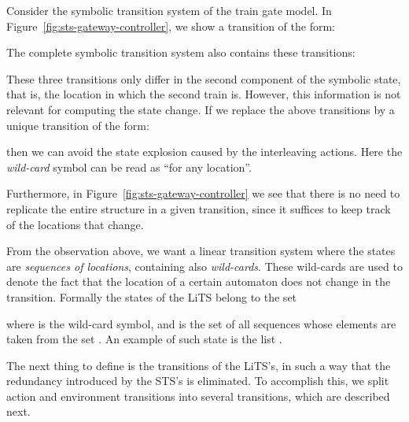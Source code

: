 \documentclass[submission,copyright,creativecommons,sharealike]{eptcs}
\begin{document}
Consider the symbolic transition system of the train gate model. In
Figure~\ref{fig:sts-gateway-controller}, we show a transition of the
form:

The complete symbolic transition system also contains these
transitions:

These three transitions only differ in the second component of the
symbolic state, that is, the location in which the second train is.
However, this information is not relevant for computing the state
change. If we replace the above transitions by a unique transition of
the form:

then we can avoid the state explosion caused by the interleaving
actions. Here the \emph{wild-card} symbol  can be read as ``for
any location''.

Furthermore, in Figure~\ref{fig:sts-gateway-controller} we see that
there is no need to replicate the entire structure in a given
transition, since it suffices to keep track of the locations that
change.

From the observation above, we want a linear transition system where
the states are \emph{sequences of locations}, containing also
\emph{wild-cards}. These wild-cards are used to denote the fact that
the location of a certain automaton does not change in the transition.
Formally the states of the LiTS belong to the set

where  is the wild-card symbol, and  is the set of all
sequences whose elements are taken from the set . An example of
such state is the list .

The next thing to define is the transitions of the LiTS's, in such a
way that the redundancy introduced by the STS's is eliminated. To
accomplish this, we split action and environment transitions into
several transitions, which are described next.
\end{document}
